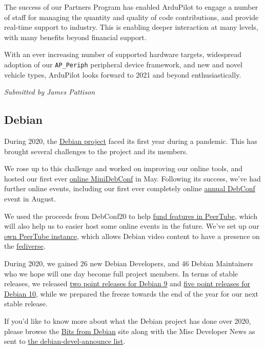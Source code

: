 \documentclass[a4paper]{report}
\begin{document}
The success of our Partners Program has enabled ArduPilot to engage a number of staff for managing the quantity and quality of code contributions, and provide real-time support to industry. This is enabling deeper interaction at many levels, with many benefits beyond financial support.

With an ever increasing number of supported hardware targets, widespread adoption of our \texttt{AP\_Periph} peripheral device framework, and new and novel vehicle types, ArduPilot looks forward to 2021 and beyond enthusiastically.

{\em Submitted by James Pattison}

\subsection{Debian}

During 2020, the \href{https://www.debian.org/}{Debian project} faced its first year during a pandemic.  This has brought several challenges to the project and its members.

We rose up to this challenge and worked on improving our online tools, and hosted our first ever \href{https://wiki.debian.org/DebianEvents/internet/2020/MiniDebConfOnline}{online MiniDebConf} in May. Following its success, we've had further online events, including our first ever completely online \href{https://debconf20.debconf.org/}{annual DebConf} event in August.

We used the proceeds from DebConf20 to help \href{https://bits.debian.org/2020/10/debian-donation-peertube.html}{fund features in PeerTube}, which will also help us to easier host some online events in the future. We've set up our \href{https://peertube.debian.social}{own PeerTube instance}, which allows
Debian video content to have a presence on the \href{https://en.wikipedia.org/wiki/Fediverse}{fediverse}.

During 2020, we gained 26 new Debian Developers, and 46 Debian Maintainers who we hope will one day become full project members.  In terms of stable releases, we released \href{https://wiki.debian.org/DebianStretch#Release_and_updates}{two point releases for Debian 9} and \href{https://wiki.debian.org/DebianBuster#Release_and_updates}{five point releases for Debian 10}, while we prepared the freeze towards the end of the year for our next stable release.

If you'd like to know more about what the Debian project has done over 2020, please browse the \href{https://bits.debian.org/}{Bits from Debian} site along with the Misc Developer News as sent to \href{https://lists.debian.org/debian-devel-announce/}{the debian-devel-announce list}.
\end{document}

